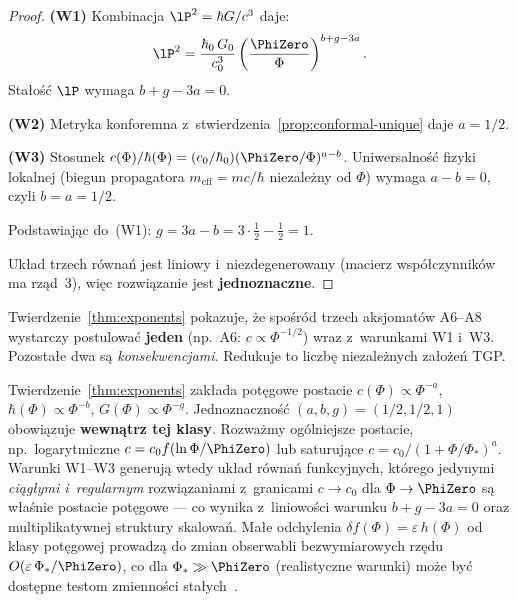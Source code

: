 \begin{proof}
\textbf{(W1)} Kombinacja $\lP^2 = \hbar G/c^3$ daje:
\[
  \lP^2 = \frac{\hbar_0\,G_0}{c_0^3}
  \left(\frac{\PhiZero}{\Phi}\right)^{b+g-3a}.
\]
Sta\l{}o\'s\'c $\lP$ wymaga $b + g - 3a = 0$.

\textbf{(W2)} Metryka konforemna z~stwierdzenia~\ref{prop:conformal-unique}
daje $a = 1/2$.

\textbf{(W3)} Stosunek $c(\Phi)/\hbar(\Phi) = (c_0/\hbar_0)(\PhiZero/\Phi)^{a-b}$.
Uniwersalno\'s\'c fizyki lokalnej (biegun propagatora $m_{\mathrm{eff}} = mc/\hbar$
niezale\.zny od $\Phi$) wymaga $a - b = 0$, czyli $b = a = 1/2$.

Podstawiaj\k{a}c do~(W1): $g = 3a - b = 3\cdot\frac{1}{2} - \frac{1}{2} = 1$.

Uk\l{}ad trzech r\'owna\'n jest liniowy i~niezdegenerowany
(macierz wsp\'o\l{}czynnik\'ow ma rz\k{a}d~3), wi\k{e}c
rozwi\k{a}zanie jest \textbf{jednoznaczne}.
\end{proof}

\begin{remark}
Twierdzenie~\ref{thm:exponents} pokazuje, \.ze spo\'sr\'od
trzech aksjomat\'ow A6--A8 wystarczy postulowa\'c \textbf{jeden}
(np.~A6: $c \propto \Phi^{-1/2}$) wraz z~warunkami W1 i~W3.
Pozosta\l{}e dwa s\k{a} \emph{konsekwencjami}. Redukuje to
liczb\k{e} niezale\.znych za\l{}o\.ze\'n TGP.
\end{remark}

\begin{remark}\label{rem:power-law-class}
Twierdzenie~\ref{thm:exponents} zak\l{}ada pot\k{e}gowe postacie
$c(\Phi)\propto\Phi^{-a}$, $\hbar(\Phi)\propto\Phi^{-b}$,
$G(\Phi)\propto\Phi^{-g}$. Jednoznaczno\'s\'c $(a,b,g)=(1/2,1/2,1)$
obowi\k{a}zuje \textbf{wewn\k{a}trz tej klasy}.
Rozwa\.zmy og\'olniejsze postacie, np.~logarytmiczne
$c = c_0 f(\ln\Phi/\PhiZero)$ lub saturuj\k{a}ce
$c = c_0/(1 + \Phi/\Phi_*)^a$. Warunki W1--W3 generuj\k{a} wtedy
uk\l{}ad r\'owna\'n funkcyjnych, kt\'orego jedynymi
\emph{ci\k{a}g\l{}ymi i~regularnym} rozwi\k{a}zaniami z~granicami
$c \to c_0$ dla $\Phi\to\PhiZero$ s\k{a} w\l{}a\'snie postacie
pot\k{e}gowe --- co wynika z~liniowo\'sci warunku $b+g-3a=0$ oraz
multiplikatywnej struktury skalowa\'n. Ma\l{}e odchylenia
$\delta f(\Phi) = \varepsilon\,h(\Phi)$ od klasy pot\k{e}gowej
prowadz\k{a} do zmian obserwabli bezwymiarowych rz\k{e}du
$O(\varepsilon\,\Phi_*/\PhiZero)$, co dla $\Phi_*\gg\PhiZero$
(realistyczne warunki) mo\.ze by\'c dost\k{e}pne testom
zmienno\'sci sta\l{}ych~\cite{Uzan2011}.
\end{remark}

